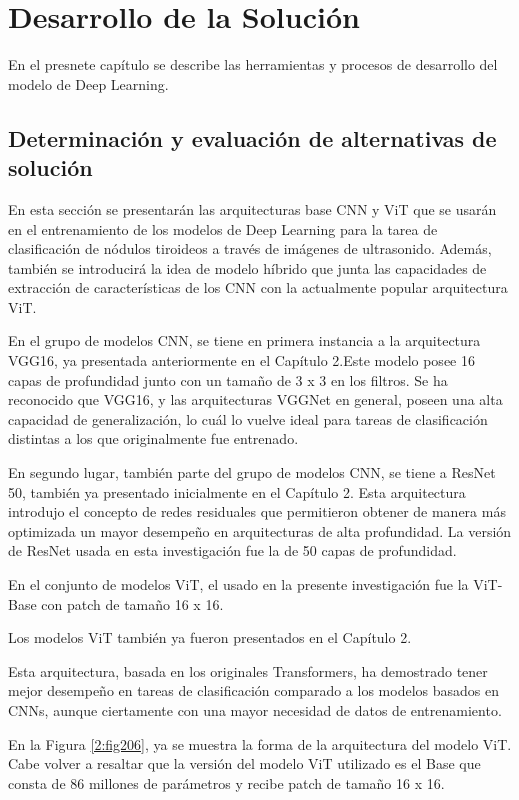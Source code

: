 \chapter{Desarrollo de la Solución}
En el presnete capítulo se describe las herramientas y procesos de desarrollo del modelo de Deep Learning.

\section{Determinación y evaluación de alternativas de solución}

En esta sección se presentarán las arquitecturas base CNN y ViT que se usarán en el entrenamiento de los modelos de Deep Learning para la tarea de clasificación de nódulos tiroideos a través de imágenes de ultrasonido. Además, también se introducirá la idea de modelo híbrido que junta las capacidades de extracción de características de los CNN con la actualmente popular arquitectura ViT.

En el grupo de modelos CNN, se tiene en primera instancia a la arquitectura VGG16, ya presentada anteriormente en el Capítulo 2.Este modelo posee 16 capas de profundidad junto con un tamaño de 3 x 3 en los filtros. Se ha reconocido que VGG16, y las arquitecturas VGGNet en general, poseen una alta capacidad de generalización, lo cuál lo vuelve ideal para tareas de clasificación distintas a los que originalmente fue entrenado. \parencite{pr_simonyan2015vdcn}

En segundo lugar, también parte del grupo de modelos CNN, se tiene a ResNet 50, también ya presentado inicialmente en el Capítulo 2. Esta arquitectura introdujo el concepto de redes residuales que permitieron obtener de manera más optimizada un mayor desempeño en arquitecturas de alta profundidad. \parencite{pr_he2016deepres} La versión de ResNet usada en esta investigación fue la de 50 capas de profundidad.

En el conjunto de modelos ViT, el usado en la presente investigación fue la ViT-Base con patch de tamaño 16 x 16.

Los modelos ViT también ya fueron presentados en el Capítulo 2.

Esta arquitectura, basada en los originales Transformers, ha demostrado tener mejor desempeño en tareas de clasificación comparado a los modelos basados en CNNs, aunque ciertamente con una mayor necesidad de datos de entrenamiento.

En la Figura \ref{2:fig206}, ya se muestra la forma de la arquitectura del modelo ViT. Cabe volver a resaltar que la versión del modelo ViT utilizado es el Base que consta de 86 millones de parámetros y recibe patch de tamaño 16 x 16.

